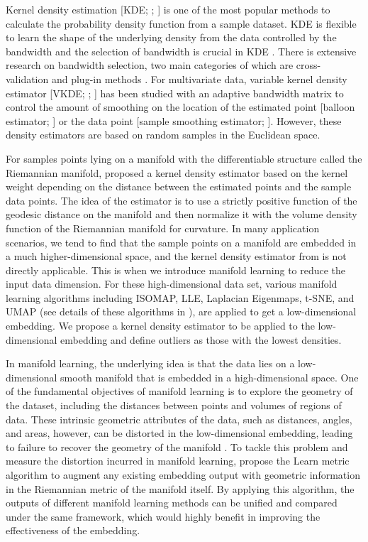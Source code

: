 \documentclass[11pt,a4paper,]{article}
\begin{document}
Kernel density estimation {[}KDE; \textcite{Parzen1962-gt}; \textcite{Chen2017-dw}{]} is one of the most popular methods to calculate the probability density function from a sample dataset. KDE is flexible to learn the shape of the underlying density from the data controlled by the bandwidth and the selection of bandwidth is crucial in KDE \autocite{Jones1990-oe,Terrell1992-ut}. There is extensive research on bandwidth selection, two main categories of which are cross-validation \autocite{Jones1992-ta,Sain1994-gr} and plug-in methods \autocite{Wand1994-gc,Duong2003-sp}. For multivariate data, variable kernel density estimator {[}VKDE; \textcite{Jones1990-oe}; \textcite{Terrell1992-ut}{]} has been studied with an adaptive bandwidth matrix to control the amount of smoothing on the location of the estimated point {[}balloon estimator; \textcite{Terrell1992-ef}{]} or the data point {[}sample smoothing estimator; \textcite{Terrell1992-ef}{]}.
However, these density estimators are based on random samples in the Euclidean space.

For samples points lying on a manifold with the differentiable structure called the Riemannian manifold, \textcite{Pelletier2005-vu} proposed a kernel density estimator based on the kernel weight depending on the distance between the estimated points and the sample data points. The idea of the estimator is to use a strictly positive function of the geodesic distance on the manifold and then normalize it with the volume density function of the Riemannian manifold for curvature. \autocite{Henry2009-ll} In many application scenarios, we tend to find that the sample points on a manifold are embedded in a much higher-dimensional space, and the kernel density estimator from \textcite{Pelletier2005-vu} is not directly applicable. This is when we introduce manifold learning to reduce the input data dimension.
For these high-dimensional data set, various manifold learning algorithms including ISOMAP, LLE, Laplacian Eigenmaps, t-SNE, and UMAP (see details of these algorithms in \textcite{Cheng2021-ex}), are applied to get a low-dimensional embedding. We propose a kernel density estimator to be applied to the low-dimensional embedding and define outliers as those with the lowest densities.

In manifold learning, the underlying idea is that the data lies on a low-dimensional smooth manifold that is embedded in a high-dimensional space. One of the fundamental objectives of manifold learning is to explore the geometry of the dataset, including the distances between points and volumes of regions of data. These intrinsic geometric attributes of the data, such as distances, angles, and areas, however, can be distorted in the low-dimensional embedding, leading to failure to recover the geometry of the manifold \autocite{Goldberg2008-co}. To tackle this problem and measure the distortion incurred in manifold learning, \textcite{Perrault-Joncas2013-pq} propose the Learn metric algorithm to augment any existing embedding output with geometric information in the Riemannian metric of the manifold itself. By applying this algorithm, the outputs of different manifold learning methods can be unified and compared under the same framework, which would highly benefit in improving the effectiveness of the embedding.
\end{document}
